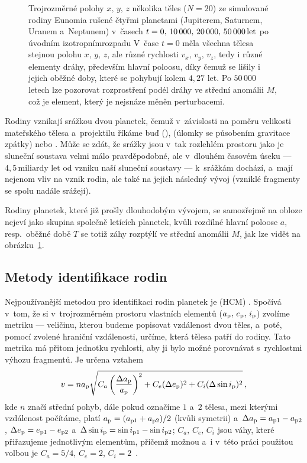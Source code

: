 \documentclass[A4paper, 12pt, oneside]{book}
\begin{document}
\begin{figure}
	\caption{Trojrozměrné polohy $x,\,y,\,z$ několika těles ($N=20$) ze simulované rodiny Eunomia rušené čtyřmi planetami (Jupiterem, Saturnem, Uranem a~Neptunem) v~časech $t=0,\,10\,000,\,20\,000,\,50\,000\,{\rm let}$ po úvodním izotropním\protect\footnotemark rozpadu V~čase $t=0$ měla všechna tělesa stejnou polohu $x,\,y,\,z$, ale různé rychlosti $v_x,\,v_y,\,v_z$, tedy i různé elementy dráhy, především hlavní poloosu, díky čemuž se lišily i jejich oběžné doby, které se pohybují kolem $4,27$ let. Po $50\,000$ letech lze pozorovat rozprostření podél dráhy ve střední anomálii $M$, což je element, který je nejsnáze měněn perturbacemi.} \label{fig:trajec}
\end{figure}

Rodiny vznikají srážkou dvou planetek, čemuž v~závislosti na poměru velikosti mateřského tělesa a~projektilu říkáme buď  (),  (úlomky se působením gravitace  zpátky) nebo . Může se zdát, že srážky jsou v~tak rozlehlém prostoru jako je sluneční soustava velmi málo pravděpodobné, ale v~dlouhém časovém úseku --- $4,5\,\text{miliardy let}$ od vzniku naší sluneční soustavy --- k~srážkám dochází, a~mají nejenom vliv na vznik rodin, ale také na jejich následný vývoj (vzniklé fragmenty se spolu nadále srážejí).

Rodiny planetek, které již prošly dlouhodobým vývojem, se samozřejmě na obloze nejeví jako skupina společně letících planetek, kvůli rozdílné hlavní poloose $a$, resp.\ oběžné době $T$ se totiž záhy rozptýlí ve střední anomálii $M$, jak lze vidět na obrázku~\ref{fig:trajec}.

\subsection{Metody identifikace rodin} \label{sec:metodyiden}
Nejpoužívanější metodou pro identifikaci rodin planetek je  (HCM) \cite{zappala90}. Spočívá v~tom, že si v~trojrozměrném prostoru vlastních elementů ($a_{\rm p},\,e_{\rm p},\,i_{\rm p}$) zvolíme metriku --- veličinu, kterou budeme popisovat vzdálenost dvou těles, a~poté, pomocí zvolené hraniční  vzdálenosti, určíme, která tělesa patří do rodiny. Tato metrika má přitom jednotku rychlosti, aby ji bylo možné porovnávat s~rychlostmi výhozu fragmentů. Je určena vztahem
\begin{align}
	v=na_{\rm p}\sqrt{C_a\left(\frac{\Delta a_{\rm p}}{a_{\rm p}}\right)^2+C_e(\Delta e_{\rm p})^2+C_i(\Delta \sin i_{\rm p})^2}\,,
\end{align}
kde $n$ značí střední pohyb, dále pokud označíme $1$ a~$2$ tělesa, mezi kterými vzdálenost počítáme, platí $a_{\rm p}=(a_{{\rm p}1}+a_{{\rm p}2})/2$ (kvůli symetrii) a~$\Delta a_{\rm p}=a_{{\rm p}1}-a_{{\rm p}2}$, $\Delta e_{\rm p}=e_{{\rm p}1}-e_{{\rm p}2}$ a~$\Delta \sin i_{\rm p}=\sin i_{{\rm p}1}-\sin i_{{\rm p}2}$; $C_a,\,C_e,\,C_i$ jsou váhy, které přiřazujeme jednotlivým elementům, přičemž možnou a~i v~této práci použitou volbou je $C_a=5/4$, $C_e=2$, $C_i=2$~\cite{zappala90}. 
\end{document}
